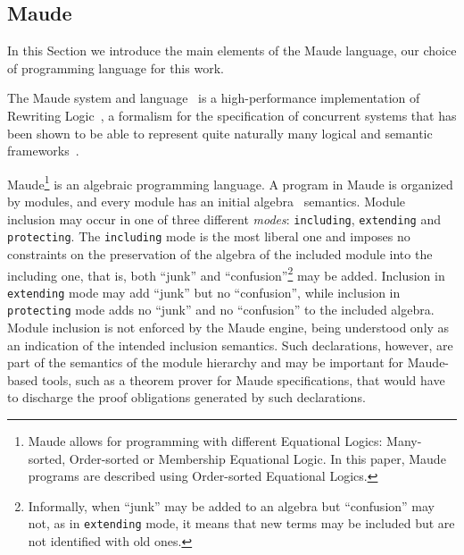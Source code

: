 \documentclass{llncs}%
\begin{document}
\subsection{Maude}\label{sec:pre-maude}

In this Section we introduce the main elements of the Maude language, our choice of programming language for this work. 

The Maude system and language~\cite{Clavel:2007:MHL:1808998} is a high-performance implementation of Rewriting Logic~\cite{meseguer92}, a formalism for the specification of concurrent systems that has been shown to be able to represent quite naturally many logical and semantic frameworks~\cite{marti-oliet-meseguer:2002}.

Maude\footnote{Maude allows for programming with different Equational Logics: Many-sorted, Order-sorted or Membership Equational Logic. In this paper, Maude programs are described using Order-sorted Equational Logics.}
is an algebraic programming language. A program in Maude is organized by modules, and every module has an initial algebra~\cite{Goguen:1996:ASI:547173} semantics. Module inclusion may occur in one of three different \emph{modes}: \texttt{including}, \texttt{extending} and \texttt{protecting}. The \texttt{including} mode is the most liberal one and imposes no constraints on the preservation of the algebra of the included module into the including one, that is, both ``junk''  and ``confusion''\footnote{Informally, when ``junk'' may be added  to an algebra but ``confusion'' may not, as in \texttt{extending} mode, it means that new terms may be included but are not identified with old ones.} may be added. Inclusion in \texttt{extending} mode may add ``junk'' but no ``confusion'', while inclusion in \texttt{protecting} mode adds no ``junk'' and no ``confusion'' to the included algebra. Module inclusion is not enforced by the Maude engine, being understood only as an indication of the intended inclusion semantics. Such declarations, however, are part of the semantics of the module hierarchy and may be important for Maude-based tools, such as a theorem prover for Maude specifications, that would have to discharge the proof obligations generated by such declarations. 
\end{document}
